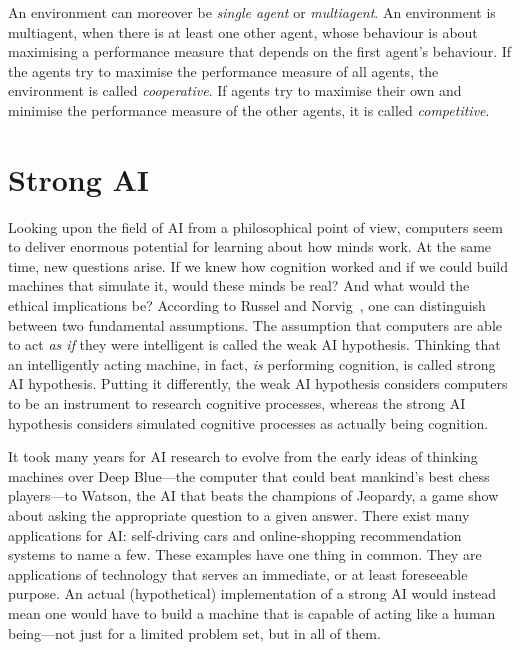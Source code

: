An environment can moreover be \emph{single agent} or \emph{multiagent}. An environment is multiagent, when there is at least one other agent, whose behaviour is about maximising a performance measure that depends on the first agent's behaviour. If the agents try to maximise the performance measure of all agents, the environment is called \emph{cooperative}. If agents try to maximise their own and minimise the performance measure of the other agents, it is called \emph{competitive}.

    \section{Strong AI}

Looking upon the field of AI from a philosophical point of view, computers seem to deliver enormous potential for learning about how minds work. At the same time, new questions arise. If we knew how cognition worked and if we could build machines that simulate it, would these minds be real? And what would the ethical implications be? According to Russel and Norvig~\cite{russell2009artificial}, one can distinguish between two fundamental assumptions. The assumption that computers are able to act \emph{as if} they were intelligent is called the weak AI hypothesis. Thinking that an intelligently acting machine, in fact, \emph{is} performing cognition, is called strong AI hypothesis. Putting it differently, the weak AI hypothesis considers computers to be an instrument to research cognitive processes, whereas the strong AI hypothesis considers simulated cognitive processes as actually being cognition.  

It took many years for AI research to evolve from the early ideas of thinking machines over Deep Blue---the computer that could beat mankind's best chess players---to Watson, the AI that beats the champions of Jeopardy, a game show about asking the appropriate question to a given answer. There exist many applications for AI: self-driving cars and online-shopping recommendation systems to name a few. These examples have one thing in common. They are applications of technology that serves an immediate, or at least foreseeable purpose. An actual (hypothetical) implementation of a strong AI would instead mean one would have to build a machine that is capable of acting like a human being---not just for a limited problem set, but in all of them. 

